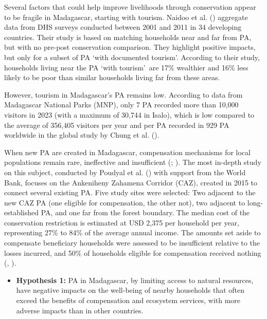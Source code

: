 \documentclass[
]{article}
\providecommand{\tightlist}{%
  \setlength{\itemsep}{0pt}\setlength{\parskip}{0pt}}\usepackage{longtable,booktabs,array}
\begin{document}
Several factors that could help improve livelihoods through conservation
appear to be fragile in Madagascar, starting with tourism. Naidoo et al.
() aggregate data from DHS
surveys conducted between 2001 and 2011 in 34 developing countries.
Their study is based on matching households near and far from PA, but
with no pre-post conservation comparison. They highlight positive
impacts, but only for a subset of PA `with documented
tourism'\footnotemark[9]. According to their study, households living
near the PA `with tourism'~are 17\% wealthier and 16\% less likely to be
poor than similar households living far from these areas.


However, tourism in Madagascar's PA remains low. According to data from
Madagascar National Parks (MNP), only 7 PA recorded more than 10,000
visitors in 2023 (with a maximum of 30,744 in Isalo), which is low
compared to the average of 356,405 visitors per year and per PA recorded
in 929 PA worldwide in the global study by Chung et al.
().

When new PA are created in Madagascar, compensation mechanisms for local
populations remain rare, ineffective and insufficient
(;
). The most in-depth study
on this subject, conducted by Poudyal et al.
() with support from the
World Bank, focuses on the Ankeniheny Zahamena Corridor (CAZ), created
in 2015 to connect several existing PA. Five study sites were selected:
Two adjacent to the new CAZ PA (one eligible for compensation, the other
not), two adjacent to long-established PA, and one far from the forest
boundary. The median cost of the conservation restriction is estimated
at USD 2,375 per household per year, representing 27\% to 84\% of the
average annual income. The amounts set aside to compensate beneficiary
households were assessed to be insufficient relative to the losses
incurred, and 50\% of households eligible for compensation received
nothing (,
).

\begin{itemize}
\tightlist
\item
  \textbf{Hypothesis 1:} PA in Madagascar, by limiting access to natural
  resources, have negative impacts on the well-being of nearby
  households that often exceed the benefits of compensation and
  ecosystem services, with more adverse impacts than in other countries.
\end{itemize}
\end{document}
